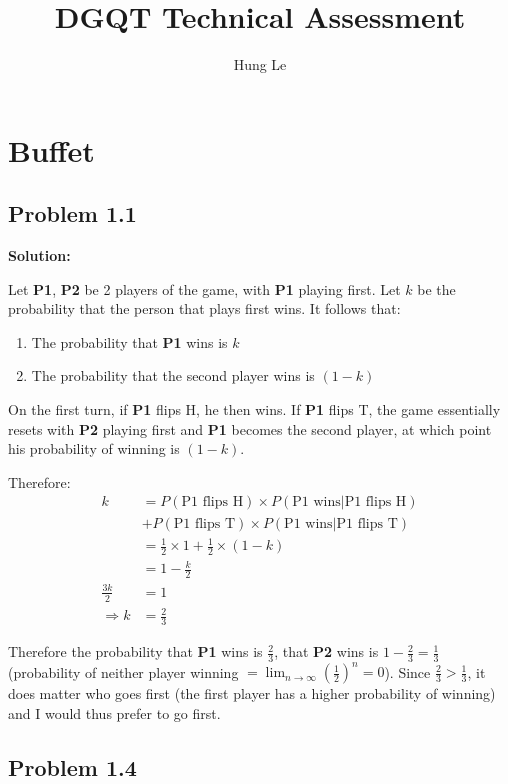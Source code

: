 \documentclass[openany, amssymb, psamsfonts]{amsart}
\title{DGQT Technical Assessment}
\author{Hung Le}
\theoremstyle{definition}
\numberwithin{equation}{section}
\begin{document}
\maketitle

\section{Buffet}

\subsection*{Problem 1.1} \mbox{}

\noindent \textbf{Solution:}

Let \textbf{P1}, \textbf{P2} be 2 players of the game, with \textbf{P1} playing first.
Let $k$ be the probability that the person that plays first wins. It follows that:
\begin{enumerate}
  \item The probability that \textbf{P1} wins is $k$
  \item The probability that the second player wins is $(1-k)$ 
\end{enumerate}

On the first turn, if \textbf{P1} flips H, he then wins. If \textbf{P1} flips T, the game essentially resets with \textbf{P2} playing first and \textbf{P1} becomes the second player, at which point his probability of winning is $(1-k)$.

Therefore:
\begin{align*}  
  k &= P(\text{P1 flips H})\times P(\text{P1 wins}|\text{P1 flips H})\\
  &+ P(\text{P1 flips T})\times P(\text{P1 wins}|\text{P1 flips T})\\
  & = \frac{1}{2} \times 1 + \frac{1}{2} \times (1-k) \\
  & = 1 - \frac{k}{2}\\
  \frac{3k}{2} &= 1\\
  \Rightarrow k &= \frac{2}{3}
\end{align*}

Therefore the probability that \textbf{P1} wins is $\frac{2}{3}$, that \textbf{P2} wins is $1- \frac{2}{3} = \frac{1}{3}$ (probability of neither player winning $= \lim_{n\rightarrow\infty}{\left(\frac{1}{2}\right)^n} = 0$). Since $ \frac{2}{3} > \frac{1}{3}$, it does matter who goes first (the first player has a higher probability of winning) and I would thus prefer to go first.

\subsection*{Problem 1.4} \mbox{}
\end{document}
